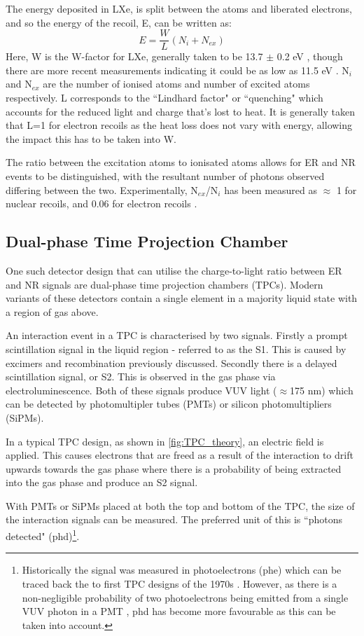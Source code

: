 \par
The energy deposited in LXe, is split between the atoms and liberated electrons, and so the energy of the recoil, E, can be written as:
\begin{equation}
    E = \frac{W}{L}(N_i + N_{ex})
\end{equation}
Here, W is the W-factor for LXe, generally taken to be 13.7 $\pm$ 0.2 eV \cite{light_and_charge_of_xenon_ref}, though there are more recent measurements indicating it could be as low as 11.5 eV \cite{electron_excitation_energy_of_xenon_ref}. 
N$_i$ and N$_{ex}$ are the number of ionised atoms and number of excited atoms respectively.
L corresponds to the ``Lindhard factor" or ``quenching" which accounts for the reduced light and charge that's lost to heat.
It is generally taken that L=1 for electron recoils as the heat loss does not vary with energy, allowing the impact this has to be taken into W.
\par
The ratio between the excitation atoms to ionisated atoms allows for ER and NR events to be distinguished, with the resultant number of photons observed differing between the two.
Experimentally, N$_{ex}$/N$_i$ has been measured as $\approx$ 1 for nuclear recoils, and 0.06 for electron recoils \cite{ionisation_to_excitation_ratio_xenon_ref}.

\subsection{Dual-phase Time Projection Chamber}
\par
One such detector design that can utilise the charge-to-light ratio between ER and NR signals are dual-phase time projection chambers (TPCs).
Modern variants of these detectors contain a single element in a majority liquid state with a region of gas above.
\par
An interaction event in a TPC is characterised by two signals.
Firstly a prompt scintillation signal in the liquid region - referred to as the S1.
This is caused by excimers and recombination previously discussed.
Secondly there is a delayed scintillation signal, or S2.
This is observed in the gas phase via electroluminescence.
Both of these signals produce VUV light ($\approx$175 nm) which can be detected by photomultipler tubes (PMTs) or silicon photomultipliers (SiPMs).
\par
In a typical TPC design, as shown in \autoref{fig:TPC_theory}, an electric field is applied.
This causes electrons that are freed as a result of the interaction to drift upwards towards the gas phase where there is a probability of being extracted into the gas phase and produce an S2 signal.
\par
With PMTs or SiPMs placed at both the top and bottom of the TPC, the size of the interaction signals can be measured.
The preferred unit of this is ``photons detected" (phd)\footnote{Historically the signal was measured in photoelectrons (phe) which can be traced back the to first TPC designs of the 1970s \cite{tpc_origins_ref}. However, as there is a non-negligible probability of two photoelectrons being emitted from a single VUV photon in a PMT \cite{pmts_in_xenon_ref}, phd has become more favourable as this can be taken into account.}.

